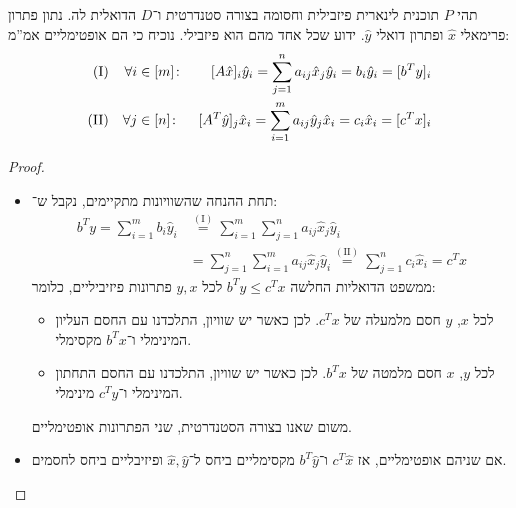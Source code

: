 \documentclass[]{../../../../tex/classes/homework}
\newcommand\I  {(\mathrm{I})}
\newcommand\II {(\mathrm{II})}
\begin{document}
	\npage
	\section{}
	תהי $P$ תוכנית לינארית פיזבילית וחסומה בצורה סטנדרטית ו־$D$ הדואלית לה. נתון פתרון פרימאלי $\hat x$ ופתרון דואלי $\hat y$. ידוע שכל אחד מהם הוא פיזבילי. נוכיח כי הם אופטימליים אמ''מ: 
	\begin{align*}
		\I && \forall i &\in [m]\co & [A\hat x]_i \hat y_i   = \sum_{j= 1}^{n} a_{ij}\hat x_j \hat y_i = b_i \hat y_i = [b^Ty]_i \\
		\II&& \forall j &\in [n]\co & [A^T\hat y]_j \hat x_i = \sum_{i= 1}^{m} a_{ij}\hat y_j \hat x_i = c_i \hat x_i = [c^Tx]_i
	\end{align*}
	
	\begin{proof}
		\begin{itemize}
			\item[$\implies$]תחת ההנחה שהשוויונות מתקיימים, נקבל ש־: 
			\begin{align*}
				b^Ty = \sum_{i = 1}^{m}b_i \hat y_i &\overset{\I}{=} \sum_{i = 1}^{m}\sum_{j= 1}^{n} a_{ij}\hat x_j \hat y_i \\
				&=\sum_{j = 1}^{n}\sum_{i = 1}^{m} a_{ij}\hat x_j \hat y_i 
				\overset{\II}{=}\sum_{j = 1}^{n}c_i\hat x_i = c^Tx
			\end{align*}
			ממשפט הדואליות החלשה $b^Ty \le c^Tx$ לכל $y, x$ פתרונות פיזיביליים, כלומר: 
			\begin{itemize}
				\item לכל $x$, $y$ חסם מלמעלה של $c^Tx$. לכן כאשר יש שוויון, התלכדנו עם החסם העליון המינימלי ו־$b^Tx$ מקסימלי. 
				\item לכל $y$, $x$ חסם מלמטה של $b^Tx$. לכן כאשר יש שוויון, התלכדנו עם החסם התחתון המינימלי ו־$c^Ty$ מינימלי. 
			\end{itemize}
			משום שאנו בצורה הסטנדרטית, שני הפתרונות אופטימליים. 
			\item[$\impliedby$]אם שניהם אופטימליים, אז $c^T\hat x$ ו־$b^T\hat y$ מקסימליים ביחס ל־$\hat x, \hat y$ ופיזיבליים ביחס לחסמים. 
			

\end{itemize}
\end{proof}
\end{document}
